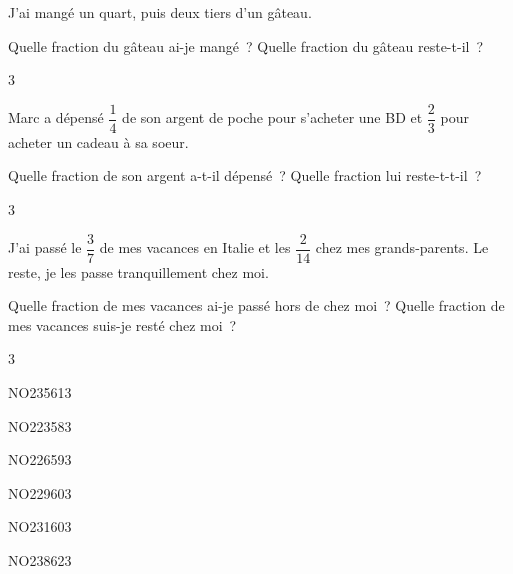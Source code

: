 \documentclass[a4paper,11pt]{report}
\begin{document}
\begin{exo}
{J'ai mangé un quart, puis deux tiers d'un gâteau. 
\begin{tasks}[after-item-skip = 0.2em]
    \task Quelle fraction du gâteau ai-je mangé~?
    \task Quelle fraction du gâteau reste-t-il~?
\end{tasks}}
{3}
\end{exo}


\begin{exo}
{\vspace{0.5em}

	Marc a dépensé $\dfrac{1}{4}$ de son argent de poche pour s'acheter une BD et $\dfrac{2}{3}$ pour acheter un cadeau à sa soeur.


\begin{tasks}[after-item-skip = 0.2em]
    \task Quelle fraction de son argent a-t-il dépensé~?
    \task Quelle fraction lui reste-t-t-il~?
\end{tasks}}
{3}
\end{exo}

\begin{exo}
	{\vspace{0.5em}

		J'ai passé le $\dfrac{3}{7}$ de mes vacances en Italie et les $\dfrac{2}{14}$ chez mes grands-parents. Le reste, je les passe tranquillement chez moi.

		\begin{tasks}[after-item-skip = 0.2em]
    \task Quelle fraction de mes vacances ai-je passé hors de chez moi~?
    \task Quelle fraction de mes vacances suis-je resté chez moi~?
\end{tasks}}
{3}
\end{exo}

\begin{exol}{NO235}{61}{3}
\end{exol}

\begin{exol}{NO223}{58}{3}
\end{exol}

\begin{exol}{NO226}{59}{3}
\end{exol}

\begin{exol}{NO229}{60}{3}
\end{exol}

\begin{exol}{NO231}{60}{3}
\end{exol}

\begin{exol}{NO238}{62}{3}
\end{exol}
\end{document}
